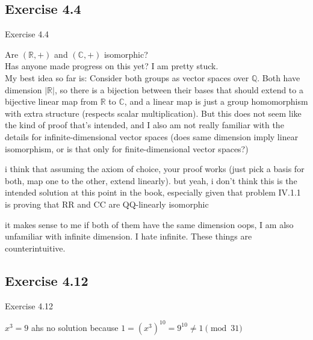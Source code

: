 \documentclass[15pt]{scrartcl}
\newcommand{\R}{\mathbb{R}}
\newcommand{\Q}{\mathbb{Q}}
\newcommand{\C}{\mathbb{C}}
\begin{document}
\subsection{Exercise 4.4}
\begin{discussion*}Exercise 4.4
    \begin{evie*}
        Are $(\R,+)$ and $(\C,+)$ isomorphic?
        \\
        Has anyone made progress on this yet? I am pretty stuck.
        \\
        My best idea so far is: Consider both groups as vector spaces over $\Q$. Both have dimension $|\R|$, so there is a bijection between their bases that should extend to a bijective linear map from $\R$ to $\C$, and a linear map is just a group homomorphism with extra structure (respects scalar multiplication). But this does not seem like the kind of proof that's intended, and I also am not really familiar with the details for infinite-dimensional vector spaces (does same dimension imply linear isomorphism, or is that only for finite-dimensional vector spaces?)
    \end{evie*}
    \begin{arthur*}
        i think that assuming the axiom of choice, your proof works (just pick a basis for both, map one to the other, extend linearly). but yeah, i don't think this is the intended solution at this point in the book, especially given that problem IV.1.1 is proving that RR and CC are QQ-linearly isomorphic
    \end{arthur*}
    \begin{abboy*}
        it makes sense to me if both of them have the same dimension
        oops, I am also unfamiliar with infinite dimension. 
        I hate infinite. These things are counterintuitive.
    \end{abboy*}
\end{discussion*}


\subsection{Exercise 4.12}
\begin{discussion*}Exercise 4.12
    \begin{abboy*}
        $x^3=9$ ahs no solution because $1=(x^3)^{10}=9^{10}\not=1 \pmod{31}$
    \end{abboy*}
\end{discussion*}
\end{document}
